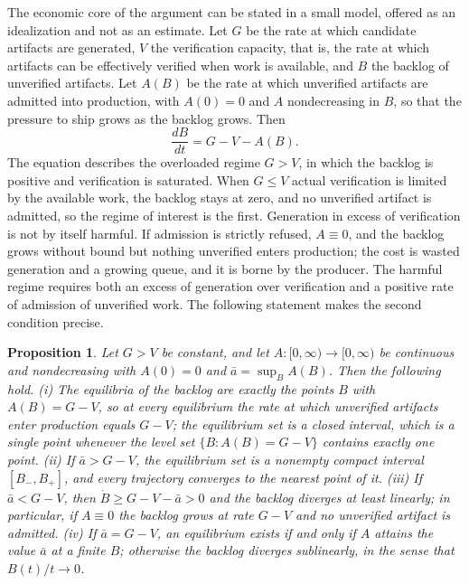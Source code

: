 \documentclass[11pt,a4paper]{article}
\newtheorem{proposition}{Proposition}
\theoremstyle{remark}
\begin{document}
The economic core of the argument can be stated in a small model, offered as an idealization and not as an estimate. Let $G$ be the rate at which candidate artifacts are generated, $V$ the verification capacity, that is, the rate at which artifacts can be effectively verified when work is available, and $B$ the backlog of unverified artifacts. Let $A(B)$ be the rate at which unverified artifacts are admitted into production, with $A(0)=0$ and $A$ nondecreasing in $B$, so that the pressure to ship grows as the backlog grows. Then
\[
\frac{dB}{dt}=G-V-A(B).
\]
The equation describes the overloaded regime $G>V$, in which the backlog is positive and verification is saturated. When $G\le V$ actual verification is limited by the available work, the backlog stays at zero, and no unverified artifact is admitted, so the regime of interest is the first.
Generation in excess of verification is not by itself harmful. If admission is strictly refused, $A\equiv 0$, and the backlog grows without bound but nothing unverified enters production; the cost is wasted generation and a growing queue, and it is borne by the producer. The harmful regime requires both an excess of generation over verification and a positive rate of admission of unverified work. The following statement makes the second condition precise.

\begin{proposition}\label{prop:admission}
Let $G>V$ be constant, and let $A:[0,\infty)\to[0,\infty)$ be continuous and nondecreasing with $A(0)=0$ and $\bar a=\sup_B A(B)$. Then the following hold. (i) The equilibria of the backlog are exactly the points $B$ with $A(B)=G-V$, so at every equilibrium the rate at which unverified artifacts enter production equals $G-V$; the equilibrium set is a closed interval, which is a single point whenever the level set $\{B:A(B)=G-V\}$ contains exactly one point. (ii) If $\bar a>G-V$, the equilibrium set is a nonempty compact interval $[B_-,B_+]$, and every trajectory converges to the nearest point of it. (iii) If $\bar a<G-V$, then $\dot B\ge G-V-\bar a>0$ and the backlog diverges at least linearly; in particular, if $A\equiv 0$ the backlog grows at rate $G-V$ and no unverified artifact is admitted. (iv) If $\bar a=G-V$, an equilibrium exists if and only if $A$ attains the value $\bar a$ at a finite $B$; otherwise the backlog diverges sublinearly, in the sense that $B(t)/t\to 0$.
\end{proposition}
\end{document}
